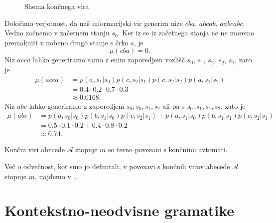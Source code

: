 \documentclass[fin1, tisk]{fmfdelo}
\newcommand{\A}{\mathcal{A}}
\theoremstyle{definition}
\begin{document}
\begin{primer}
\begin{figure}[H]
        \caption{Shema končnega vira}
        \label{fig:FSM}
    \end{figure}
    Določimo verjetnost, da naš informacijski vir generira nize $\mathit{cba}$, $\mathit{abcab}$, 
    $\mathit{aabcabc}$. Vedno začnemo v začetnem stanju $s_0$. Ker iz se iz začetnega stanja 
    ne ne moremo premakniti v nobeno drugo stanje s črko $s$, je
    \[
        \mu(\mathit{cba}) = 0.
    \]
    Niz $\mathit{acca}$ lahko generiramo samo z enim zaporedjem vozlišč 
    $s_0$, $s_1$, $s_2$, $s_2$, $s_1$, zato je
    \begin{align*}
        \mu(\mathit{acca}) &= p(a, s_1|s_0)p(c, s_2|s_1)p(c, s_2|s_2)p(a, s_1|s_2) \\
        &= 0.4 \cdot 0.2 \cdot 0.7 \cdot 0.3 \\
        &\approx 0.0168.
    \end{align*}
    Niz $\mathit{abc}$ lahko generiramo z zaporedjem $s_0, s_0, s_1, s_2$ ali pa s
    $s_0, s_1, s_1, s_2$, zato je
    \begin{align*}
        \mu(\mathit{abc}) &= p(a, s_0|s_0)p(b, s_1|s_0)p(c, s_2|s_1) 
        + p(a, s_1|s_0)p(b, s_1|s_1)p(c, s_2|s_1) \\
        &= 0.5 \cdot 0.1 \cdot 0.2 + 0.4 \cdot 0.8 \cdot 0.2 \\
        &\approx 0.74.
    \end{align*}
\end{primer}

\begin{opomba} %
    Končni viri abecede $\A$ stopnje $m$ so tesno povezani s končnimi avtomati.
\end{opomba}

Več o odvečnost, kot smo jo definirali, v povezavi s končnih virov abecede $\A$ stopnje $m$,
najdemo v~\cite{Plotkin1992}.

\section{Kontekstno-neodvisne gramatike}
\end{document}
